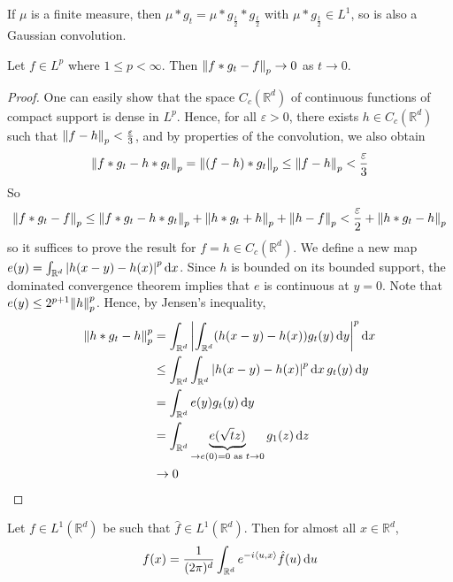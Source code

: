 \begin{remark}
	If \( \mu \) is a finite measure, then \( \mu \ast g_t = \mu \ast g_{\frac{t}{2}} \ast g_{\frac{t}{2}} \) with \( \mu \ast g_{\frac{t}{2}} \in L^1 \), so is also a Gaussian convolution.
\end{remark}
\begin{lemma}
	Let \( f \in L^p \) where \( 1 \leq p < \infty \).
	Then \( \norm{f \ast g_t - f}_p \to 0 \) as \( t \to 0 \).
\end{lemma}
\begin{proof}
	One can easily show that the space \( C_c(\mathbb R^d) \) of continuous functions of compact support is dense in \( L^p \).
	Hence, for all \( \varepsilon > 0 \), there exists \( h \in C_c(\mathbb R^d) \) such that \( \norm{f - h}_p < \frac{\varepsilon}{3} \), and by properties of the convolution, we also obtain
	\[ \norm{f \ast g_t - h \ast g_t}_p = \norm{(f - h) \ast g_t}_p \leq \norm{f - h}_p < \frac{\varepsilon}{3} \]
	So
	\[ \norm{f \ast g_t - f}_p \leq \norm{f \ast g_t - h \ast g_t}_p + \norm{h \ast g_t + h}_p + \norm{h - f}_p < \frac{\varepsilon}{2} + \norm{h \ast g_t - h}_p \]
	so it suffices to prove the result for \( f = h \in C_c(\mathbb R^d) \).
	We define a new map \( e(y) = \int_{\mathbb R^d} \abs{h(x-y) - h(x)}^p \dd{x} \).
	Since \( h \) is bounded on its bounded support, the dominated convergence theorem implies that \( e \) is continuous at \( y = 0 \).
	Note that \( e(y) \leq 2^{p+1} \norm{h}_p^p \).
	Hence, by Jensen's inequality,
	\begin{align*}
		\norm{h \ast g_t - h}_p^p &= \int_{\mathbb R^d} \abs{ \int_{\mathbb R^d} (h(x-y) - h(x)) g_t(y) \dd{y} }^p \dd{x} \\
		&\leq \int_{\mathbb R^d} \int_{\mathbb R^d} \abs{h(x-y) - h(x)}^p \dd{x} g_t(y) \dd{y} \\
		&= \int_{\mathbb R^d} e(y) g_t(y) \dd{y} \\
		&= \int_{\mathbb R^d} \underbrace{e(\sqrt{t} z)}_{\to e(0) = 0 \text{ as } t \to 0} g_1(z) \dd{z} \\
		&\to 0
	\end{align*}
\end{proof}
\begin{theorem}
	Let \( f \in L^1(\mathbb R^d) \) be such that \( \hat f \in L^1(\mathbb R^d) \).
	Then for almost all \( x \in \mathbb R^d \),
	\[ f(x) = \frac{1}{(2\pi)^d} \int_{\mathbb R^d} e^{-i\left\langle{u,x}\right\rangle} \hat f(u) \dd{u} \]
\end{theorem}
